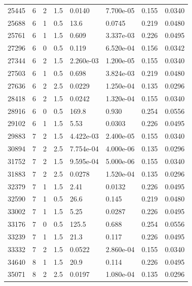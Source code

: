 \documentclass[preview]{standalone}
\begin{document}
{{{\begin{tabular}{L{1.2cm}C{1.2cm} C{0.3cm}C{0.5cm} C{1.4cm}C{1.4cm} C{1.4cm}C{1.4cm}}
  25445  &     6  & 2     & 1.5 &  0.0140  & 7.700e-05  & 0.155 &  0.0340   \\ 
  25688  &     6  & 1     & 0.5 &  13.6  & 0.0745  & 0.219 &  0.0480   \\ 
  25761  &     6  & 1     & 1.5 &  0.609  & 3.337e-03  & 0.226 &  0.0495   \\ 
  27296  &     6  & 0     & 0.5 &  0.119  & 6.520e-04  & 0.156 &  0.0342   \\ 
  27344  &     6  & 2     & 1.5 &  2.260e-03  & 1.200e-05  & 0.155 &  0.0340   \\ 
  27503  &     6  & 1     & 0.5 &  0.698  & 3.824e-03  & 0.219 &  0.0480   \\ 
  27636  &     6  & 2     & 2.5 &  0.0229  & 1.250e-04  & 0.135 &  0.0296   \\ 
  28418  &     6  & 2     & 1.5 &  0.0242  & 1.320e-04  & 0.155 &  0.0340   \\ 
  28916  &     6  & 0     & 0.5 &  169.8  & 0.930  & 0.254 &  0.0556   \\ 
  29102  &     6  & 1     & 1.5 &  5.53  & 0.0303  & 0.226 &  0.0495   \\ 
  29883  &     7  & 2     & 1.5 &  4.422e-03  & 2.400e-05  & 0.155 &  0.0340   \\ 
  30894  &     7  & 2     & 2.5 &  7.754e-04  & 4.000e-06  & 0.135 &  0.0296   \\ 
  31752  &     7  & 2     & 1.5 &  9.595e-04  & 5.000e-06  & 0.155 &  0.0340   \\ 
  31883  &     7  & 2     & 2.5 &  0.0278  & 1.520e-04  & 0.135 &  0.0296   \\ 
  32379  &     7  & 1     & 1.5 &  2.41  & 0.0132  & 0.226 &  0.0495   \\ 
  32590  &     7  & 1     & 0.5 &  26.6  & 0.145  & 0.219 &  0.0480   \\ 
  33002  &     7  & 1     & 1.5 &  5.25  & 0.0287  & 0.226 &  0.0495   \\ 
  33176  &     7  & 0     & 0.5 &  125.5  & 0.688  & 0.254 &  0.0556   \\ 
  33239  &     7  & 1     & 1.5 &  21.3  & 0.117  & 0.226 &  0.0495   \\ 
  33332  &     7  & 2     & 1.5 &  0.0522  & 2.860e-04  & 0.155 &  0.0340   \\ 
  34640  &     8  & 1     & 1.5 &  20.9  & 0.114  & 0.226 &  0.0495   \\ 
  35071  &     8  & 2     & 2.5 &  0.0197  & 1.080e-04  & 0.135 &  0.0296   \\ 

\end{tabular}}}}
\end{document}
